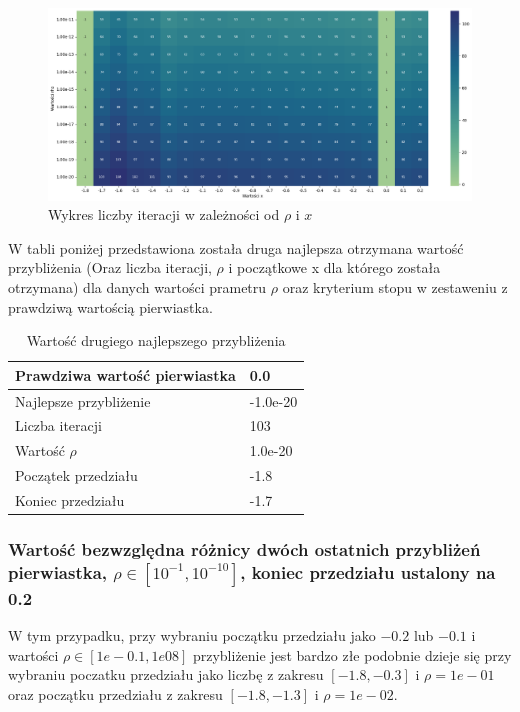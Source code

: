 \documentclass{article}
\begin{document}
\begin{figure}[H]
  \centering
  \begin{minipage}[b]{0.9\textwidth}
    \includegraphics[width=\textwidth]{heatmap20.png}
  \end{minipage}
  \caption{Wykres liczby iteracji w zależności od \(\rho\) i \(x\)}
\end{figure}

\noindent
W tabli poniżej przedstawiona została druga najlepsza otrzymana wartość przybliżenia (Oraz liczba iteracji, \(\rho\) i początkowe x dla którego została otrzymana) dla danych wartości prametru \(\rho\) oraz kryterium stopu w zestaweniu z prawdziwą wartością pierwiastka.

\begin{table}[H]
    \centering
    \begin{tabular}{|l|l|}
    \hline
        Prawdziwa wartość pierwiastka & 0.0 \\ \hline
        Najlepsze przybliżenie & -1.0e-20 \\ \hline
        Liczba iteracji & 103 \\ \hline
        Wartość $\rho$ & 1.0e-20 \\ \hline
        Początek przedziału & -1.8 \\ \hline
        Koniec przedziału & -1.7 \\ \hline
    \end{tabular}
    \caption{Wartość drugiego najlepszego przybliżenia}
\end{table}

\subsubsection{Wartość bezwzględna różnicy dwóch ostatnich przybliżeń pierwiastka, \(\rho \in [10^{-1}, 10^{-10}]\), koniec przedziału ustalony na 0.2}

W tym przypadku, przy wybraniu początku przedziału jako \(-0.2\) lub \(-0.1\) i wartości \(\rho \in [1e-0.1, 1e08]\) przybliżenie jest bardzo złe podobnie dzieje się przy wybraniu poczatku przedziału jako liczbę z zakresu \([-1.8, -0.3]\) i \(\rho = 1e-01\) oraz początku przedziału z zakresu \([-1.8, -1.3]\) i \(\rho = 1e-02\).
\end{document}
